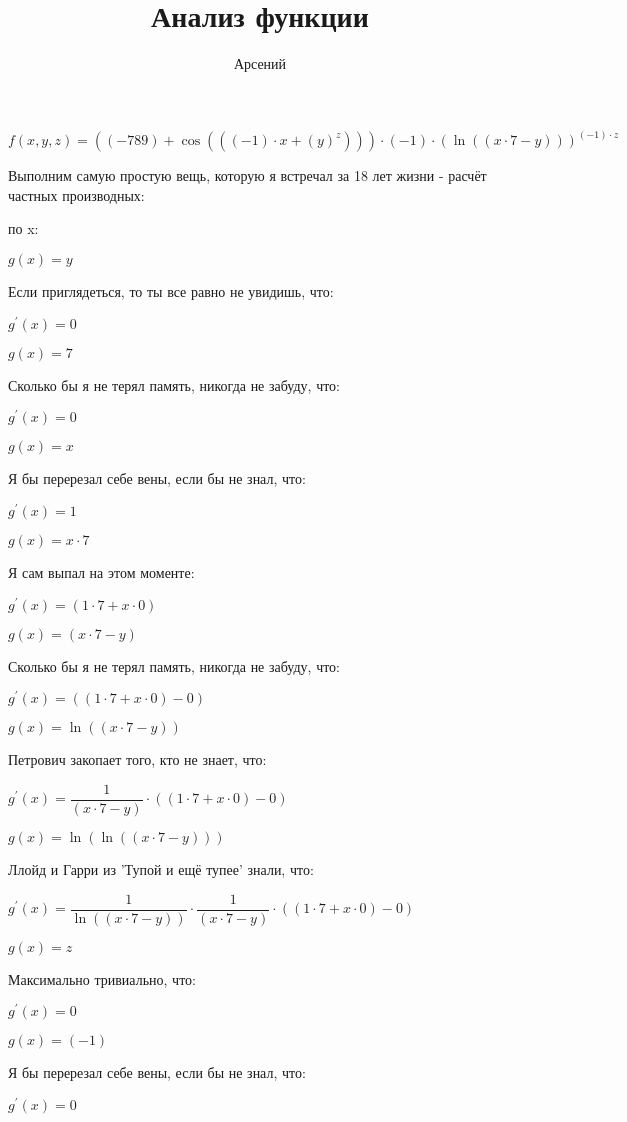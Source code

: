 \documentclass[a4paper,12pt]{article}
\author{\LARGEМерзляков Арсений}
\title{Анализ функции}
\begin{document}
\maketitle
\begin{flushleft}
\Large
$f(x, y, z) = ((-789)+\cos {(((-1) \cdot x+(y)^{z}))}) \cdot (-1) \cdot (\ln {((x \cdot 7-y))})^{(-1) \cdot z}$

Выполним самую простую вещь, которую я встречал за 18 лет жизни - расчёт частных производных:

 по x:

$g(x) = y$

Если приглядеться, то ты все равно не увидишь, что:

$g^{'}(x) = 0$

$g(x) = 7$

Сколько бы я не терял память, никогда не забуду, что:

$g^{'}(x) = 0$

$g(x) = x$

Я бы перерезал себе вены, если бы не знал, что:

$g^{'}(x) = 1$

$g(x) = x \cdot 7$

Я сам выпал на этом моменте:

$g^{'}(x) = (1 \cdot 7+x \cdot 0)$

$g(x) = (x \cdot 7-y)$

Сколько бы я не терял память, никогда не забуду, что:

$g^{'}(x) = ((1 \cdot 7+x \cdot 0)-0)$

$g(x) = \ln {((x \cdot 7-y))}$

Петрович закопает того, кто не знает, что:

$g^{'}(x) =  \dfrac{1}{(x \cdot 7-y)}  \cdot ((1 \cdot 7+x \cdot 0)-0)$

$g(x) = \ln {(\ln {((x \cdot 7-y))})}$

Ллойд и Гарри из 'Тупой и ещё тупее' знали, что:

$g^{'}(x) =  \dfrac{1}{\ln {((x \cdot 7-y))}}  \cdot  \dfrac{1}{(x \cdot 7-y)}  \cdot ((1 \cdot 7+x \cdot 0)-0)$

$g(x) = z$

Максимально тривиально, что:

$g^{'}(x) = 0$

$g(x) = (-1)$

Я бы перерезал себе вены, если бы не знал, что:

$g^{'}(x) = 0$


\end{flushleft}
\end{document}

